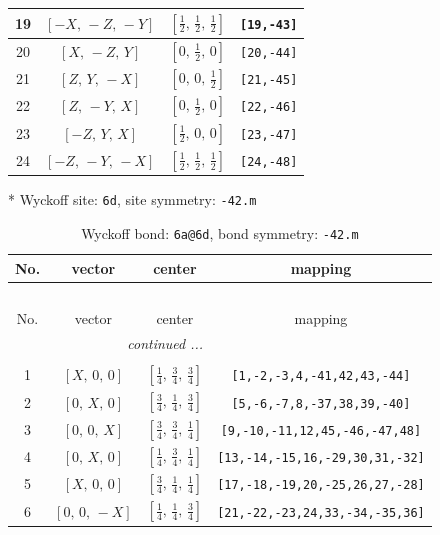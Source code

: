 \documentclass[fleqn,8pt]{jsarticle}
\begin{document}
\begin{longtable}{cccc}
19 & $\left[ - X,\, - Z,\, - Y \right]$ & $\left[ \frac{1}{2},\, \frac{1}{2},\, \frac{1}{2} \right]$ & {\tt [19,-43]} \\ \hline
20 & $\left[ X,\, - Z,\, Y \right]$ & $\left[ 0,\, \frac{1}{2},\, 0 \right]$ & {\tt [20,-44]} \\ \hline
21 & $\left[ Z,\, Y,\, - X \right]$ & $\left[ 0,\, 0,\, \frac{1}{2} \right]$ & {\tt [21,-45]} \\ \hline
22 & $\left[ Z,\, - Y,\, X \right]$ & $\left[ 0,\, \frac{1}{2},\, 0 \right]$ & {\tt [22,-46]} \\ \hline
23 & $\left[ - Z,\, Y,\, X \right]$ & $\left[ \frac{1}{2},\, 0,\, 0 \right]$ & {\tt [23,-47]} \\ \hline
24 & $\left[ - Z,\, - Y,\, - X \right]$ & $\left[ \frac{1}{2},\, \frac{1}{2},\, \frac{1}{2} \right]$ & {\tt [24,-48]} \\
\end{longtable}
* Wyckoff site: {\tt 6d}, site symmetry: {\tt -42.m}
\renewcommand{\arraystretch}{1.2}
\begin{longtable}{cccc}
\caption{Wyckoff bond: {\tt 6a@6d}, bond symmetry: {\tt -42.m}}
 \\
 \hline \hline
No. & vector & center & mapping \\ \hline \endfirsthead

\multicolumn{3}{l}{\tablename\ \thetable{}} \\
 \hline \hline
No. & vector & center & mapping \\ \hline \endhead

 \hline \hline
\multicolumn{3}{r}{\footnotesize\it continued ...} \\ \endfoot

 \hline \hline
\multicolumn{3}{r}{} \\ \endlastfoot

1 & $\left[ X,\, 0,\, 0 \right]$ & $\left[ \frac{1}{4},\, \frac{3}{4},\, \frac{3}{4} \right]$ & {\tt [1,-2,-3,4,-41,42,43,-44]} \\ \hline
2 & $\left[ 0,\, X,\, 0 \right]$ & $\left[ \frac{3}{4},\, \frac{1}{4},\, \frac{3}{4} \right]$ & {\tt [5,-6,-7,8,-37,38,39,-40]} \\ \hline
3 & $\left[ 0,\, 0,\, X \right]$ & $\left[ \frac{3}{4},\, \frac{3}{4},\, \frac{1}{4} \right]$ & {\tt [9,-10,-11,12,45,-46,-47,48]} \\ \hline
4 & $\left[ 0,\, X,\, 0 \right]$ & $\left[ \frac{1}{4},\, \frac{3}{4},\, \frac{1}{4} \right]$ & {\tt [13,-14,-15,16,-29,30,31,-32]} \\ \hline
5 & $\left[ X,\, 0,\, 0 \right]$ & $\left[ \frac{3}{4},\, \frac{1}{4},\, \frac{1}{4} \right]$ & {\tt [17,-18,-19,20,-25,26,27,-28]} \\ \hline
6 & $\left[ 0,\, 0,\, - X \right]$ & $\left[ \frac{1}{4},\, \frac{1}{4},\, \frac{3}{4} \right]$ & {\tt [21,-22,-23,24,33,-34,-35,36]} \\
\end{longtable}
\end{document}
